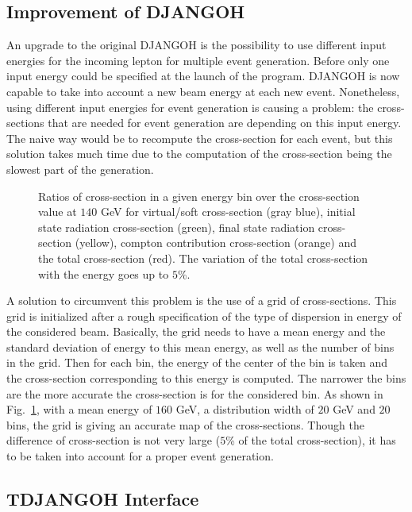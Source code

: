 \subsection{Improvement of DJANGOH}

An upgrade to the original DJANGOH is the possibility to use different input energies for the incoming lepton for multiple event generation. Before only one input energy could be specified at the launch of the program. DJANGOH is now capable to take into account a new beam energy at each new event. Nonetheless, using different input energies for event generation is causing a problem: the cross-sections that are needed for event generation are depending on this input energy. The naive way would be to recompute the cross-section for each event, but this solution takes much time due to the computation of the cross-section being the slowest part of the generation.

\begin{figure}[htb]
\centerline{}
\caption{Ratios of cross-section in a given energy bin over the cross-section value at $140$ GeV for virtual/soft cross-section (gray blue), initial state radiation cross-section (green), final state radiation cross-section (yellow), compton contribution cross-section (orange) and the total cross-section (red). The variation of the total cross-section with the energy goes up to $5$\%.}\label{fig:gridxs}
\end{figure}

A solution to circumvent this problem is the use of a grid of cross-sections. This grid is initialized after a rough specification of the type of dispersion in energy of the considered beam. Basically, the grid needs to have a mean energy and the standard deviation of energy to this mean energy, as well as the number of bins in the grid. Then for each bin, the energy of the center of the bin is taken and the cross-section corresponding to this energy is computed. The narrower the bins are the more accurate the cross-section is for the considered bin. As shown in Fig.~\ref{fig:gridxs}, with a mean energy of $160$ GeV, a distribution width of $20$ GeV and $20$ bins, the grid is giving an accurate map of the cross-sections. Though the difference of cross-section is not very large ($5$\% of the total cross-section), it has to be taken into account for a proper event generation.

\subsection{TDJANGOH Interface}

